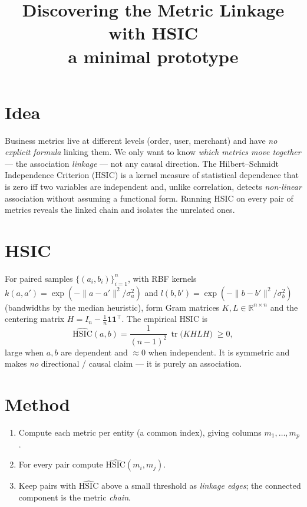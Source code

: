 \documentclass[11pt]{article}
\title{\textbf{Discovering the Metric Linkage with HSIC\\
\large a minimal prototype}}
\author{}
\date{}
\newcommand{\R}{\mathbb{R}}
\newcommand{\HSIC}{\mathrm{HSIC}}
\begin{document}
\maketitle

\section{Idea}

Business metrics live at different levels (order, user, merchant) and have
\emph{no explicit formula} linking them. We only want to know \emph{which metrics
move together} --- the association \emph{linkage} --- not any causal direction.
The Hilbert--Schmidt Independence Criterion (HSIC) is a kernel measure of
statistical dependence that is zero iff two variables are independent and, unlike
correlation, detects \emph{non-linear} association without assuming a functional
form. Running HSIC on every pair of metrics reveals the linked chain and isolates
the unrelated ones.

\section{HSIC}

For paired samples $\{(a_i,b_i)\}_{i=1}^n$, with RBF kernels
$k(a,a')=\exp(-\|a-a'\|^2/\sigma_a^2)$ and $l(b,b')=\exp(-\|b-b'\|^2/\sigma_b^2)$
(bandwidths by the median heuristic), form Gram matrices $K,L\in\R^{n\times n}$
and the centering matrix $H=I_n-\tfrac1n\mathbf{1}\mathbf{1}^\top$. The empirical
HSIC is
\begin{equation}
\widehat{\HSIC}(a,b)=\frac{1}{(n-1)^2}\,\operatorname{tr}\!\big(KHLH\big)\;\ge 0,
\end{equation}
large when $a,b$ are dependent and $\approx 0$ when independent. It is symmetric
and makes \emph{no} directional / causal claim --- it is purely an association.

\section{Method}

\begin{enumerate}
\item Compute each metric per entity (a common index), giving columns
$m_1,\dots,m_p$.
\item For every pair compute $\widehat{\HSIC}(m_i,m_j)$.
\item Keep pairs with $\widehat{\HSIC}$ above a small threshold as
\emph{linkage edges}; the connected component is the metric \emph{chain}.
\end{enumerate}
\end{document}
